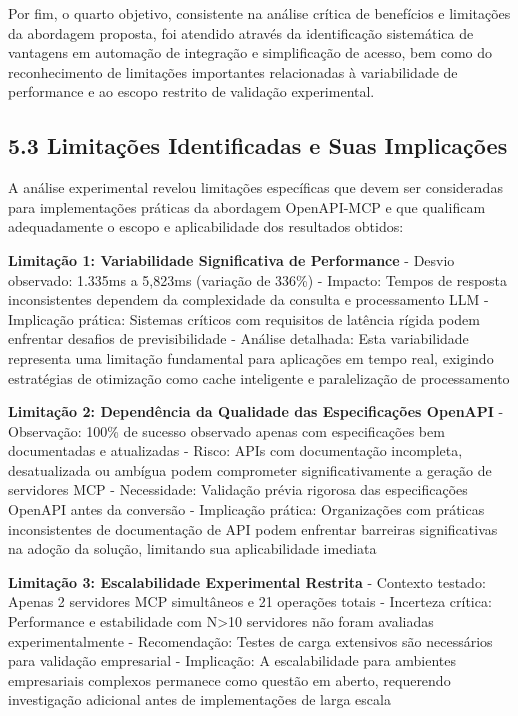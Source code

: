 \documentclass[
]{article}
\begin{document}
Por fim, o quarto objetivo, consistente na análise crítica de benefícios
e limitações da abordagem proposta, foi atendido através da
identificação sistemática de vantagens em automação de integração e
simplificação de acesso, bem como do reconhecimento de limitações
importantes relacionadas à variabilidade de performance e ao escopo
restrito de validação experimental.

\subsection{5.3 Limitações Identificadas e Suas
Implicações}\label{limitauxe7uxf5es-identificadas-e-suas-implicauxe7uxf5es}

A análise experimental revelou limitações específicas que devem ser
consideradas para implementações práticas da abordagem OpenAPI-MCP e que
qualificam adequadamente o escopo e aplicabilidade dos resultados
obtidos:

\textbf{Limitação 1: Variabilidade Significativa de Performance} -
Desvio observado: 1.335ms a 5,823ms (variação de 336\%) - Impacto:
Tempos de resposta inconsistentes dependem da complexidade da consulta e
processamento LLM - Implicação prática: Sistemas críticos com requisitos
de latência rígida podem enfrentar desafios de previsibilidade - Análise
detalhada: Esta variabilidade representa uma limitação fundamental para
aplicações em tempo real, exigindo estratégias de otimização como cache
inteligente e paralelização de processamento

\textbf{Limitação 2: Dependência da Qualidade das Especificações
OpenAPI} - Observação: 100\% de sucesso observado apenas com
especificações bem documentadas e atualizadas - Risco: APIs com
documentação incompleta, desatualizada ou ambígua podem comprometer
significativamente a geração de servidores MCP - Necessidade: Validação
prévia rigorosa das especificações OpenAPI antes da conversão -
Implicação prática: Organizações com práticas inconsistentes de
documentação de API podem enfrentar barreiras significativas na adoção
da solução, limitando sua aplicabilidade imediata

\textbf{Limitação 3: Escalabilidade Experimental Restrita} - Contexto
testado: Apenas 2 servidores MCP simultâneos e 21 operações totais -
Incerteza crítica: Performance e estabilidade com N\textgreater10
servidores não foram avaliadas experimentalmente - Recomendação: Testes
de carga extensivos são necessários para validação empresarial -
Implicação: A escalabilidade para ambientes empresariais complexos
permanece como questão em aberto, requerendo investigação adicional
antes de implementações de larga escala
\end{document}
